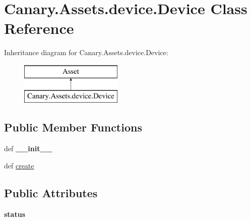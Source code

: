 \hypertarget{class_canary_8_assets_1_1device_1_1_device}{\section{Canary.\-Assets.\-device.\-Device Class Reference}
\label{class_canary_8_assets_1_1device_1_1_device}
}
Inheritance diagram for Canary.\-Assets.\-device.\-Device\-:\begin{figure}[H]
\begin{center}
\leavevmode
\includegraphics[height=2.000000cm]{class_canary_8_assets_1_1device_1_1_device}
\end{center}
\end{figure}
\subsection*{Public Member Functions}
\begin{DoxyCompactItemize}
\item 
\hypertarget{class_canary_8_assets_1_1device_1_1_device_a22fa95397369099b9a2abef0267faf08}{def {\bfseries \-\_\-\-\_\-init\-\_\-\-\_\-}}\label{class_canary_8_assets_1_1device_1_1_device_a22fa95397369099b9a2abef0267faf08}

\item 
def \hyperlink{class_canary_8_assets_1_1device_1_1_device_a06a76942dd4e867f041602df3ba02ed5}{create}
\end{DoxyCompactItemize}
\subsection*{Public Attributes}
\begin{DoxyCompactItemize}
\item 
\hypertarget{class_canary_8_assets_1_1device_1_1_device_a126669c0aa87cb32cfb2c8e33288a07b}{{\bfseries status}}\label{class_canary_8_assets_1_1device_1_1_device_a126669c0aa87cb32cfb2c8e33288a07b}

\end{DoxyCompactItemize}


